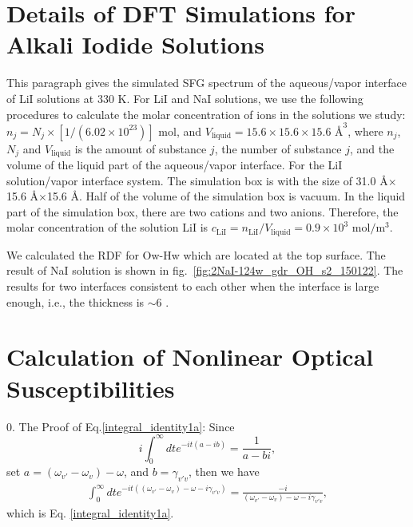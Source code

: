 \section{Details of DFT Simulations for Alkali Iodide Solutions}
This paragraph gives the simulated SFG spectrum of the aqueous/vapor interface of LiI solutions at 330 K.
For LiI and NaI solutions, we use the following procedures to calculate the molar concentration of ions in the solutions we study:
$n_j=N_j\times[1/(6.02\times10^{23})] {\text{ mol}}$, and
$V_{\text{liquid}}=15.6\times15.6\times15.6 \text{ \AA}^3$, 
where $n_j$, $N_j$ and $V_{\text{liquid}}$ is the amount of substance $j$, the number of substance $j$, and the 
volume of the liquid part of the aqueous/vapor interface.  
For the LiI solution/vapor interface system. 
The simulation box is with the size of 31.0 \AA$ \times$15.6 \AA$ \times$15.6 \AA. 
Half of the volume of the simulation box is vacuum. In the liquid part of the simulation box, there are two \Li cations and two \I anions.
Therefore, the molar concentration of the solution LiI is $c_{\text{LiI}}={n_{\text{LiI}}}/{V_\text{liquid}}=0.9\times10^3  \text{ mol}/\text{m}^3$.

We calculated the RDF for Ow-Hw which are located at the top surface. The result of NaI solution is shown in fig.~\ref{fig:2NaI-124w_gdr_OH_s2_150122}.
The results  for two interfaces consistent to each other when the interface is large enough, i.e., the thickness is $\sim 6$ \A.

\section{Calculation of Nonlinear Optical Susceptibilities}\label{calculation_of_chi}

%
0. The Proof of Eq.\space\ref{integral_identity1a}:
Since 
\begin{equation}
  i\int_0^\infty dt e^{-it(a-ib)}=\frac{1}{a-bi},
  \label{integral_identity1}
\end{equation}
set $a = (\omega_{v'} - \omega_{v}) - \omega$, and $b = \gamma_{v'v}$,
then we have
 \begin{align}
 \int_0^\infty dt e^{-it((\omega_{v'}-\omega_v)-\omega-i\gamma_{v'v})}=\frac{-i}{(\omega_{v'} -\omega_v)-\omega-i\gamma_{v'v}},\nonumber
 \end{align}
which is Eq. \ref{integral_identity1a}.

